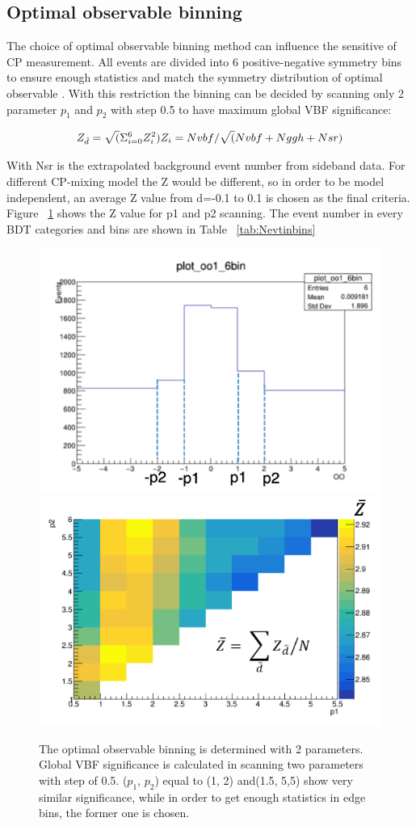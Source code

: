\subsection{Optimal observable binning}
The choice of optimal observable binning method can influence the sensitive of CP measurement. All events are divided into 6 positive-negative symmetry bins to ensure enough statistics and match the symmetry distribution of optimal observable . With this restriction the binning can be decided by scanning only 2 parameter $p_1$ and $p_2$ with step 0.5 to have maximum global VBF significance:

$$
 Z_{\tilde{d}} = \sqrt(\Sigma_{i=0}^{6} Z_{i}^{2}) \\
 Z_{i} = Nvbf/\sqrt(Nvbf+Nggh+Nsr)
$$

With Nsr is the extrapolated background event number from sideband data. For different CP-mixing model the Z would be different, so in order to be model independent, an average Z value from d=-0.1 to 0.1 is chosen as the final criteria. Figure ~\ref{fig:Zvsp} shows the Z value for p1 and p2 scanning. The event number in every BDT categories and bins are shown in Table ~\ref{tab:Nevtinbins}
\begin{figure}[tbp]
  \centering
  \includegraphics[width=0.45\linewidth]{figure/OObinning/binning.png}
  \includegraphics[width=0.45\linewidth]{figure/OObinning/Zscanning.png}
  \caption{The optimal observable binning is determined with 2 parameters. Global VBF significance is calculated in scanning two parameters with step of 0.5. ($p_1$, $p_2$) equal to (1, 2) and(1.5, 5,5) show very similar significance, while in order to get enough statistics in edge bins, the former one is chosen.}
  \label{fig:Zvsp}
\end{figure}

